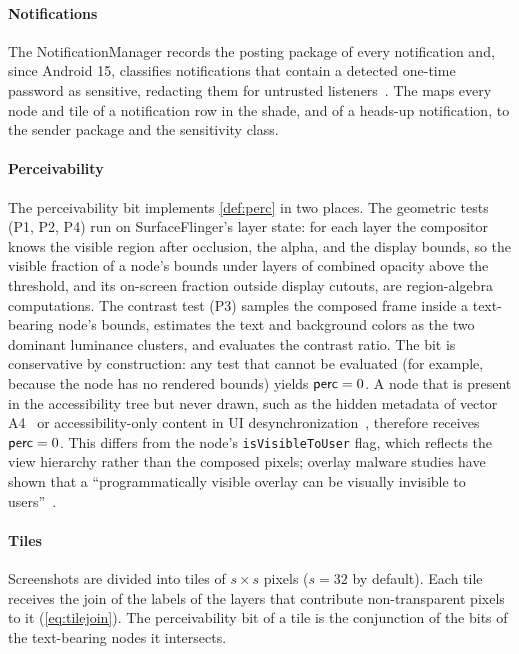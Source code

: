 \paragraph{Notifications} The NotificationManager records the posting package of every notification and, since Android 15, classifies notifications that contain a detected one-time password as sensitive, redacting them for untrusted listeners~\cite{android15_otp_redaction}. The \LS{} maps every node and tile of a notification row in the shade, and of a heads-up notification, to the sender package and the sensitivity class.

\paragraph{Perceivability} The perceivability bit implements \cref{def:perc} in two places. The geometric tests (P1, P2, P4) run on SurfaceFlinger's layer state: for each layer the compositor knows the visible region after occlusion, the alpha, and the display bounds, so the visible fraction of a node's bounds under layers of combined opacity above the threshold, and its on-screen fraction outside display cutouts, are region-algebra computations. The contrast test (P3) samples the composed frame inside a text-bearing node's bounds, estimates the text and background colors as the two dominant luminance clusters, and evaluates the contrast ratio. The bit is conservative by construction: any test that cannot be evaluated (for example, because the node has no rendered bounds) yields $\mathsf{perc}=0$. A node that is present in the accessibility tree but never drawn, such as the hidden metadata of vector A4~\cite{deivasigamani2026nota11y} or accessibility-only content in UI desynchronization~\cite{li2026uidesync}, therefore receives $\mathsf{perc}=0$. This differs from the node's \texttt{isVisibleToUser} flag, which reflects the view hierarchy rather than the composed pixels; overlay malware studies have shown that a ``programmatically visible overlay can be visually invisible to users''~\cite{yan2019overlay}.

\paragraph{Tiles} Screenshots are divided into tiles of $s\times s$ pixels ($s=32$ by default). Each tile receives the join of the labels of the layers that contribute non-transparent pixels to it (\cref{eq:tilejoin}). The perceivability bit of a tile is the conjunction of the bits of the text-bearing nodes it intersects.

